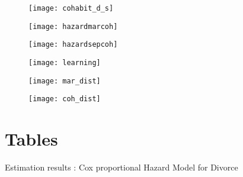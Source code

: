 \documentclass[12pt]{article}
\begin{document}
\begin{figure}[H]
	\centering
	\texttt{[image: cohabit\_d\_s]}
	\caption{}
	\label{fig:cohabit_d_s}
\end{figure}

\begin{figure}[H]
	\centering
	\texttt{[image: hazardmarcoh]}
	\caption{}
	\label{fig:hazardmarcoh}
\end{figure}

\begin{figure}[H]
	\centering
	\texttt{[image: hazardsepcoh]}
	\caption{}
	\label{fig:hazardsepcoh}
\end{figure}

\begin{figure}
\centering
\texttt{[image: learning]}
\caption{}
\label{fig:learning}
\end{figure}

\begin{figure}
	\centering
	\texttt{[image: mar\_dist]}
	\caption{}
	\label{fig:mar_dist}
\end{figure}

\begin{figure}
	\centering
	\texttt{[image: coh\_dist]}
	\caption{}
	\label{fig:coh_dist}
\end{figure}

\section*{Tables}




\label{table:descrma}

\label{table:descrco}



{	
	\def\onepc{$^{\ast\ast}$} \def\fivepc{$^{\ast}$}
	\def\tenpc{$^{\dag}$}
	\def\legend{\multicolumn{3}{l}{\footnotesize{Significance levels
				:\hspace{1em} $\ast$ : 10\% \hspace{1em}
				$\ast\ast$ : 5\% \hspace{1em} $\ast\ast\ast$ : 1\% \normalsize}}}
	\begin{table}[htbp]\centering
		\caption{Estimation results : Cox proportional Hazard Model for Divorce
			\label{tabresult cox_tot}}
		
	\end{table}
}
\end{document}
